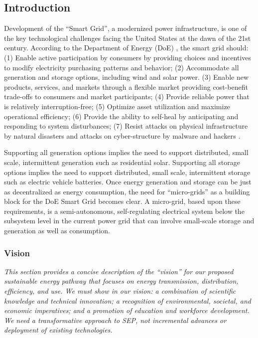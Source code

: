 
\subsection{Introduction}

Development of the ``Smart Grid'', a modernized power infrastructure, is
one of the key technological challenges facing the United States at the
dawn of the 21st century. According to the Department of Energy (DoE) , the smart
grid should: (1) Enable active participation by consumers by providing
choices and incentives to modify electricity purchasing patterns and
behavior; (2) Accommodate all generation and storage options, including
wind and solar power.  (3) Enable new products, services, and markets
through a flexible market providing cost-benefit trade-offs to consumers
and market participants; (4) Provide reliable power that is relatively
interruption-free; (5) Optimize asset utilization and maximize operational
efficiency; (6) Provide the ability to self-heal by anticipating and
responding to system disturbances; (7) Resist attacks on physical
infrastructure by natural disasters and attacks on cyber-structure by
malware and hackers \cite{NETL:GridCharacteristics}.

Supporting all generation options implies the need to support distributed,
small scale, intermittent generation such as residential solar.  Supporting
all storage options implies the need to support distributed, small scale,
intermittent storage such as electric vehicle batteries.  Once energy
generation and storage can be just as decentralized as energy consumption,
the need for ``micro-grids'' as a building block for the DoE Smart Grid
becomes clear.  A micro-grid, based upon these requirements, is a
semi-autonomous, self-regulating electrical system below the subsystem
level in the current power grid that can involve small-scale storage and
generation as well as consumption.

\subsubsection{Vision}
{\em This section provides a concise description of the ``vision'' for our
  proposed sustainable energy pathway that focuses on energy transmission,
  distribution, efficiency, and use.
  We must show in our vision: a combination of scientific knowledge and
  technical innovation; a recognition of environmental, societal, and
  economic imperatives; and a promotion of education and workforce
  development.
  We need a transformative approach to SEP, not incremental advances or
  deployment of existing technologies. }

